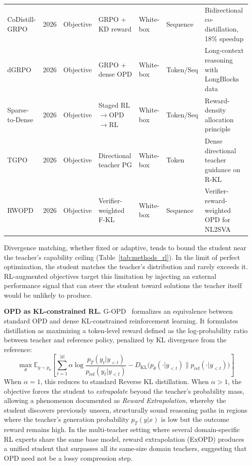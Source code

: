 \documentclass{article} %
\newcommand{\E}{\mathbb{E}}
\newcommand{\KL}{D_{\mathrm{KL}}}
\newcommand{\ptheta}{p_\theta}
\newcommand{\pteacher}{p_T}
\begin{document}
\begin{table}[t]
{\begin{tabular}{@{}lclllll@{}}
        CoDistill-GRPO \citep{2605.08873} & 2026 & Objective & GRPO + KD reward & White-box & Sequence & Bidirectional co-distillation, 18\% speedup \\
        dGRPO \citep{2605.12227} & 2026 & Objective & GRPO + dense OPD & White-box & Token/Seq & Long-context reasoning with LongBlocks data \\
        Sparse-to-Dense \citep{2605.12483} & 2026 & Objective & Staged RL$\to$OPD$\to$RL & White-box & Token/Seq & Reward-density allocation principle \\
        TGPO \citep{2605.13230} & 2026 & Objective & Directional teacher PG & White-box & Token & Dense directional teacher guidance on R-KL \\
        RWOPD \citep{2605.13501} & 2026 & Objective & Verifier-weighted F-KL & White-box & Sequence & Verifier-reward-weighted OPD for NL2SVA \\
        \bottomrule
    \end{tabular}
    }
\end{table}

Divergence matching, whether fixed or adaptive, tends to bound the student near the teacher's capability ceiling (Table~\ref{tab:methods_rl}). In the limit of perfect optimization, the student matches the teacher's distribution and rarely exceeds it. RL-augmented objectives target this limitation by injecting an external performance signal that can steer the student toward solutions the teacher itself would be unlikely to produce.

\textbf{OPD as KL-constrained RL.} G-OPD~\citep{2602.12125} formalizes an equivalence between standard OPD and dense KL-constrained reinforcement learning. It formulates distillation as maximizing a token-level reward defined as the log-probability ratio between teacher and reference policy, penalized by KL divergence from the reference:
\begin{equation}
    \max_\theta \E_{y \sim \ptheta} \left[ \sum_{t=1}^{|y|} \alpha \log \frac{\pteacher(y_t | y_{<t})}{p_{\text{ref}}(y_t | y_{<t})} - \KL\big(\ptheta(\cdot | y_{<t}) \parallel p_{\text{ref}}(\cdot | y_{<t})\big) \right]
\end{equation}
When $\alpha = 1$, this reduces to standard Reverse KL distillation. When $\alpha > 1$, the objective forces the student to \emph{extrapolate} beyond the teacher's probability mass, allowing a phenomenon documented as \emph{Reward Extrapolation}, whereby the student discovers previously unseen, structurally sound reasoning paths in regions where the teacher's generation probability $\pteacher(y|x)$ is low but the outcome reward remains high. In the multi-teacher setting where several domain-specific RL experts share the same base model, reward extrapolation (ExOPD) produces a unified student that surpasses all its same-size domain teachers, suggesting that OPD need not be a lossy compression step.
\end{document}
